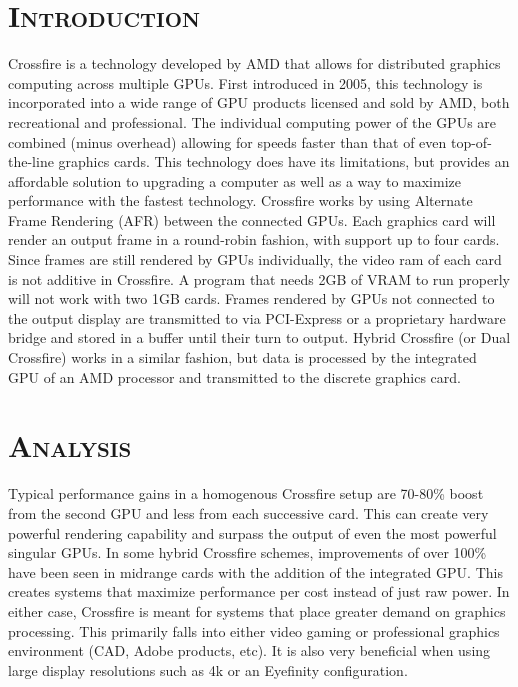 \documentclass[11pt]{report}
\begin{document}
\begin{spacing}{1.5}
\section*{\scshape Introduction}

Crossfire is a technology developed by AMD that allows for distributed graphics computing 
across multiple GPUs. First introduced in 2005, this technology is incorporated into a wide range of GPU 
products licensed and sold by AMD, both recreational and professional. The individual computing power 
of the GPUs are combined (minus overhead) allowing for speeds faster than that of even top-of-the-line 
graphics cards. This technology does have its limitations, but provides an affordable solution 
to upgrading a computer as well as a way to maximize performance with the fastest technology.
Crossfire works by using Alternate Frame Rendering (AFR) between the connected GPUs. Each 
graphics card will render an output frame in a round-robin fashion, with support up to four cards. Since 
frames are still rendered by GPUs individually, the video ram of each card is not additive in Crossfire. A 
program that needs 2GB of VRAM to run properly will not work with two 1GB cards. Frames rendered by 
GPUs not connected to the output display are transmitted to via PCI-Express or a proprietary hardware 
bridge and stored in a buffer until their turn to output. Hybrid Crossfire (or Dual Crossfire) works in a 
similar fashion, but data is processed by the integrated GPU of an AMD processor and transmitted to the 
discrete graphics card.

\section*{\scshape Analysis}

Typical performance gains in a homogenous Crossfire setup are 70-80\% boost from the second 
GPU and less from each successive card. This can create very powerful rendering capability and surpass 
the output of even the most powerful singular GPUs. In some hybrid Crossfire schemes, improvements 
of over 100\% have been seen in midrange cards with the addition of the integrated GPU. This creates 
systems that maximize performance per cost instead of just raw power.
In either case, Crossfire is meant for systems that place greater demand on graphics processing. 
This primarily falls into either video gaming or professional graphics environment (CAD, Adobe products, 
etc). It is also very beneficial when using large display resolutions such as 4k or an Eyefinity 
configuration. 
\vspace{20px}


\end{spacing}
\end{document}
